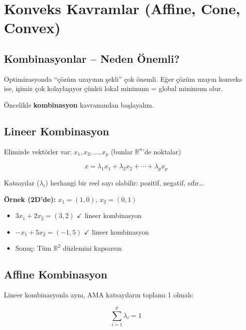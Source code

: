 \documentclass[12pt,a4paper]{article}
\theoremstyle{definition}
\theoremstyle{remark}
\begin{document}
\newpage

\section{Konveks Kavramlar (Affine, Cone, Convex)}

\subsection{Kombinasyonlar -- Neden \"Onemli?}

Optimizasyonda ``\c{c}\"oz\"um uzay{\i}n{\i}n \c{s}ekli'' \c{c}ok \"onemli. E\u{g}er \c{c}\"oz\"um uzay{\i}n konveks ise, i\c{s}imiz \c{c}ok kolayla\c{s}{\i}yor \c{c}\"unk\"u lokal minimum = global minimum olur.

\"Oncelikle \textbf{kombinasyon} kavram{\i}ndan ba\c{s}layal{\i}m.

\subsection{Lineer Kombinasyon}

Elimizde vekt\"orler var: $x_1, x_2, \ldots, x_p$ (bunlar $\mathbb{R}^n$'de noktalar)

\[
x = \lambda_1 x_1 + \lambda_2 x_2 + \cdots + \lambda_p x_p
\]

Katsay{\i}lar ($\lambda_i$) herhangi bir reel say{\i} olabilir: pozitif, negatif, s{\i}f{\i}r\ldots

\textbf{\"Ornek (2D'de):} $x_1 = (1, 0)$, $x_2 = (0, 1)$
\begin{itemize}
    \item $3x_1 + 2x_2 = (3, 2)$ $\checkmark$ lineer kombinasyon
    \item $-x_1 + 5x_2 = (-1, 5)$ $\checkmark$ lineer kombinasyon
    \item Sonu\c{c}: T\"um $\mathbb{R}^2$ d\"uzlemini kapsars{\i}n
\end{itemize}

\subsection{Affine Kombinasyon}

Lineer kombinasyonla ayn{\i}, AMA katsay{\i}lar{\i}n toplam{\i} 1 olmal{\i}:

\[
\sum_{i=1}^{p} \lambda_i = 1
\]
\end{document}
